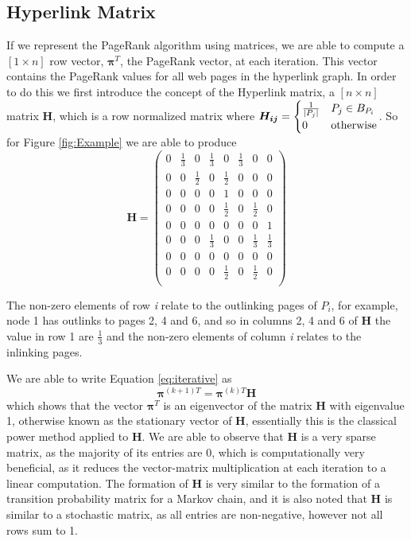 \documentclass[11pt]{report}
\begin{document}
\subsection{Hyperlink Matrix} \label{sec:hyperlink}
If we represent the PageRank algorithm using matrices, we are able to compute a $ [1 \times \textit{n}]$ row vector, $\boldsymbol{\pi}^T$, the PageRank vector, at each iteration. This vector contains the PageRank values for all web pages in the hyperlink graph. In order to do this we first introduce the concept of the Hyperlink matrix, a $[\textit{n}\times \textit{n}]$ matrix \textbf{H}, which is a row normalized matrix where 
\(\boldsymbol{H_{ij}} = \begin{cases} \frac{1}{\vert P_j \vert} & P_j\in B_{P_i } \\ 0 & \textnormal{otherwise} \end{cases}\). So for Figure \ref{fig:Example} we are able to produce 
\[\textbf{H}=\left(
\begin{array}{cccccccc}
0 & \frac{1}{3} & 0 & \frac{1}{3} & 0 &\frac{1}{3} & 0& 0 \\
0 & 0 &\frac{1}{2}& 0 &\frac{1}{2}& 0 & 0 & 0\\
0 & 0 & 0 & 0 & 1 & 0 & 0 & 0\\
0 & 0 & 0 & 0 & \frac{1}{2} & 0 & \frac{1}{2} & 0\\
0 & 0 & 0 & 0 & 0 & 0 & 0 & 1\\
0 & 0 & 0 & \frac{1}{3} & 0 & 0 & \frac{1}{3} & \frac{1}{3} \\
0 & 0 & 0 & 0 & 0 & 0 & 0 & 0\\
0 & 0 & 0 & 0 & \frac{1}{2} & 0 & \frac{1}{2} & 0\\
\end{array}
\right)	\]

The non-zero elements of row \textit{i} relate to the outlinking pages of $P_i$, for example, node 1 has outlinks to pages 2, 4 and 6, and so in columns 2, 4 and 6 of \textbf{H} the value in row 1 are $\frac{1}{3}$ and the non-zero elements of column \textit{i} relates to the inlinking pages.

We are able to write Equation \eqref{eq:iterative} as \begin{equation} \label{eq:power H}
\boldsymbol\pi^{(k+1)T} = \boldsymbol\pi^{(k)T}\textbf{H}
\end{equation}  which shows that the vector $\boldsymbol\pi^T$ is an eigenvector of the matrix \textbf{H} with eigenvalue 1, otherwise known as the stationary vector of \textbf{H}, essentially this is the classical power method applied to \textbf{H}. We are able to observe that \textbf{H} is a very sparse matrix, as the majority of its entries are 0, which is computationally very beneficial, as it reduces the vector-matrix multiplication at each iteration to a linear computation. The formation of \textbf{H} is very similar to the formation of a transition probability matrix for a Markov chain, and it is also noted that \textbf{H} is similar to a stochastic matrix, as all entries are non-negative, however not all rows sum to 1.
\end{document}
